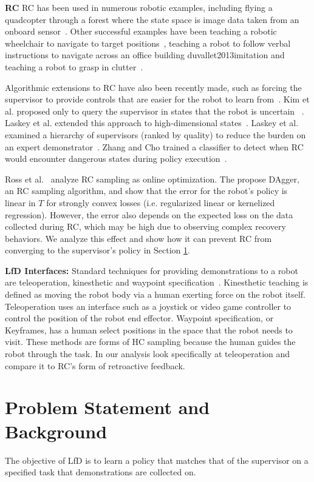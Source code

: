 \documentclass[10pt, conference]{ieeeconf}      %
\newcommand{\nc}{RC }
\begin{document}
\noindent \textbf{\nc}
\nc has been used in numerous robotic examples, including flying a quadcopter through a forest where the state space is image data taken from an onboard sensor~\cite{ross2013learning}. Other successful examples have been teaching a robotic wheelchair to navigate to target positions~\cite{kim2013maximum}, teaching a robot to follow verbal instructions to navigate across an office building {duvallet2013imitation} and teaching a robot to grasp in clutter~\cite{laskeyrobot}.

Algorithmic extensions to \nc have also been recently made, such as forcing the supervisor to provide controls that are easier for the robot to learn from~\cite{he2012imitation}.  Kim et al. proposed only to query the supervisor in states that the robot is uncertain~\cite{kim2013maximum} . Laskey et al. extended this approach to high-dimensional states~\cite{laskeyshiv}. Laskey et al. examined a hierarchy of supervisors (ranked by quality)  to reduce the burden on an expert demonstrator~\cite{laskeyrobot}. Zhang and Cho trained a classifier to detect when \nc would encounter dangerous states during policy execution~\cite{zhang2016query}.

Ross et al.~\cite{ross2010reduction} analyze RC sampling as online optimization. The propose DAgger, an RC sampling algorithm, and show that the error for the robot's policy is linear in $T$ for strongly convex losses (i.e.  regularized linear or kernelized regression). 
However, the error also depends on the expected loss on the data collected during RC, which may be high due to observing complex recovery behaviors. We analyze this effect and show how it can prevent RC from converging to the supervisor's policy in Section \ref{sec:PS}.

\textbf{LfD Interfaces:}
Standard techniques for providing demonstrations to a robot are teleoperation, kinesthetic and waypoint specification~\cite{akgun2012keyframe,akgun2012novel,argall2009survey}. Kinesthetic teaching is defined as moving the robot body via a human exerting force on the robot itself. Teleoperation uses an interface such as a joystick or video game controller to control the position of the robot end effector. Waypoint specification, or Keyframes, has a human select positions in the space that the robot needs to visit. These methods are forms of HC sampling because the human guides the robot through the task.  In our analysis look specifically at teleoperation and compare it to RC's form of retroactive feedback. 

\section{Problem Statement and Background}\label{sec:PS}
The objective of LfD is to learn a policy that matches that of the supervisor on a specified task that demonstrations are collected on.
\end{document}
